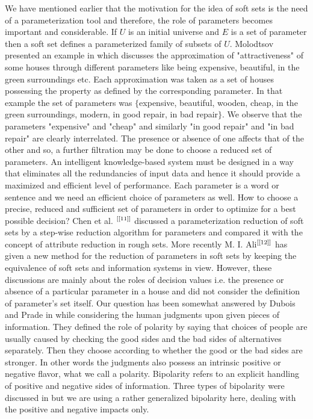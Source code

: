 \documentclass{amsart}
\theoremstyle{plain}
\numberwithin{equation}{section}
\begin{document}
We have mentioned earlier that the motivation for the idea of soft sets is
the need of a parameterization tool and therefore, the role of parameters
becomes important and considerable. If $U$ is an initial universe and $E$ is
a set of parameter then a soft set defines a parameterized family of subsets
of $U$. Molodtsov presented an example in \cite{[1]} which discusses the
approximation of "attractiveness" of some houses through different
parameters like being expensive, beautiful, in the green surroundings etc.
Each approximation was taken as a set of houses possessing the property as
defined by the corresponding parameter. In that example the set of
parameters was $\{$expensive, beautiful, wooden, cheap, in the green
surroundings, modern, in good repair, in bad repair$\}$. We observe that the
parameters "expensive" and "cheap" and similarly "in good repair" and "in
bad repair" are clearly interrelated. The presence or absence of one affects
that of the other and so, a further filtration may be done to choose a
reduced set of parameters. An intelligent knowledge-based system must be
designed in a way that eliminates all the redundancies of input data and
hence it should provide a maximized and efficient level of performance. Each
parameter is a word or sentence and we need an efficient choice of
parameters as well. How to choose a precise, reduced and sufficient set of
parameters in order to optimize for a best possible decision? Chen et al. $^{\text{\cite{[11]}}}$ discussed a parameterization reduction of soft sets by
a step-wise reduction algorithm for parameters and compared it with the
concept of attribute reduction in rough sets. More recently M. I. Ali$^{\text{\cite{[12]}}}$ has given a new method for the reduction of parameters
in soft sets by keeping the equivalence of soft sets and information systems
in view. However, these discussions are mainly about the roles of decision
values i.e. the presence or absence of a particular parameter in a house and
did not consider the definition of parameter's set itself. Our question has
been somewhat answered by Dubois and Prade in \cite{[13]} while considering
the human judgments upon given pieces of information. They defined the role
of polarity by saying that choices of people are usually caused by checking
the good sides and the bad sides of alternatives separately. Then they
choose according to whether the good or the bad sides are stronger. In other
words the judgments also possess an intrinsic positive or negative flavor,
what we call a polarity. Bipolarity refers to an explicit handling of
positive and negative sides of information. Three types of bipolarity were
discussed in \cite{[13]} but we are using a rather generalized bipolarity
here, dealing with the positive and negative impacts only.
\end{document}
